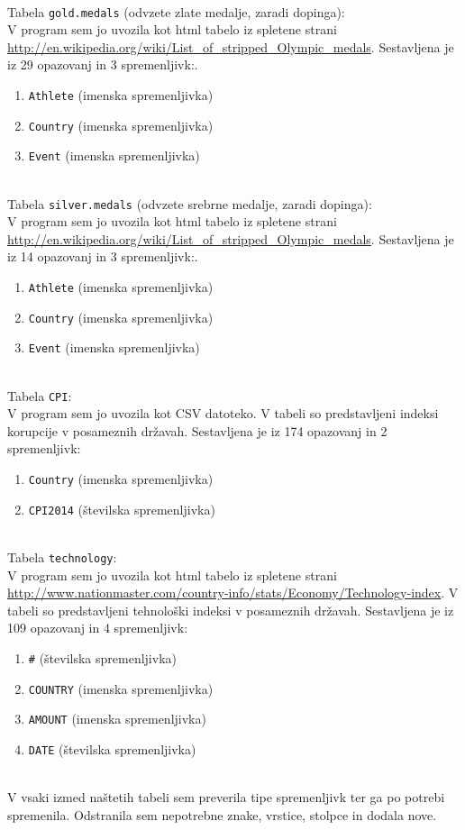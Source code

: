 \documentclass[11pt,a4paper]{article}
\begin{document}
\
\\
Tabela \verb|gold.medals| (odvzete zlate medalje, zaradi dopinga):
\
\\
V program sem jo uvozila kot html tabelo iz spletene strani \url{http://en.wikipedia.org/wiki/List_of_stripped_Olympic_medals}.
Sestavljena je iz 29 opazovanj in 3 spremenljivk:.
\begin{enumerate}
\item{\verb|Athlete| (imenska spremenljivka)}
\item{\verb|Country| (imenska spremenljivka)}
\item{\verb|Event| (imenska spremenljivka)}

\end{enumerate}


\
\\
Tabela \verb|silver.medals| (odvzete srebrne medalje, zaradi dopinga):
\
\\
V program sem jo uvozila kot html tabelo iz spletene strani \url{http://en.wikipedia.org/wiki/List_of_stripped_Olympic_medals}.
Sestavljena je iz 14 opazovanj in 3 spremenljivk:.
\begin{enumerate}
\item{\verb|Athlete| (imenska spremenljivka)}
\item{\verb|Country| (imenska spremenljivka)}
\item{\verb|Event| (imenska spremenljivka)}

\end{enumerate}
\
\\
Tabela \verb|CPI|:
\
\\
V program sem jo uvozila kot CSV datoteko. V tabeli so predstavljeni indeksi korupcije v posameznih državah.
Sestavljena je iz 174 opazovanj in 2 spremenljivk:
\begin{enumerate}
\item{\verb|Country| (imenska spremenljivka)}
\item{\verb|CPI2014| (številska spremenljivka)}

\end{enumerate}
\
\\
Tabela \verb|technology|:
\
\\
V program sem jo uvozila kot html tabelo iz spletene strani \url{http://www.nationmaster.com/country-info/stats/Economy/Technology-index}.
V tabeli so predstavljeni tehnološki indeksi v posameznih državah.
Sestavljena je iz 109 opazovanj in 4 spremenljivk:
\begin{enumerate}

\item{\verb|#| (številska spremenljivka)}
\item{\verb|COUNTRY| (imenska spremenljivka)}
\item{\verb|AMOUNT| (imenska spremenljivka)}
\item{\verb|DATE| (številska spremenljivka)}
\end{enumerate}
\
\\
V vsaki izmed naštetih tabeli sem preverila tipe spremenljivk ter ga po potrebi spremenila. Odstranila sem nepotrebne znake, vrstice, stolpce in dodala nove.
\\
\end{document}
